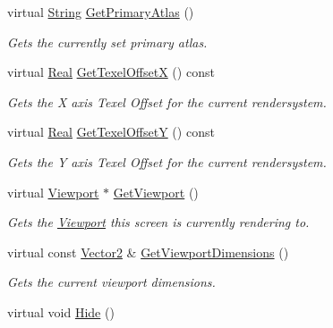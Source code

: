 \begin{DoxyCompactItemize}
virtual \hyperlink{namespaceMezzanine_acf9fcc130e6ebf08e3d8491aebcf1c86}{String} \hyperlink{classMezzanine_1_1UI_1_1Screen_adafbc28919ebb4d2d65e54daa0676177}{GetPrimaryAtlas} ()
\begin{DoxyCompactList}\small\item\em Gets the currently set primary atlas. \item\end{DoxyCompactList}\item 
virtual \hyperlink{namespaceMezzanine_a726731b1a7df72bf3583e4a97282c6f6}{Real} \hyperlink{classMezzanine_1_1UI_1_1Screen_af713ab0b229c33e0878e1f0d681e731f}{GetTexelOffsetX} () const 
\begin{DoxyCompactList}\small\item\em Gets the X axis Texel Offset for the current rendersystem. \item\end{DoxyCompactList}\item 
virtual \hyperlink{namespaceMezzanine_a726731b1a7df72bf3583e4a97282c6f6}{Real} \hyperlink{classMezzanine_1_1UI_1_1Screen_a1b8584eaecf431a164a8d31c55bf38b5}{GetTexelOffsetY} () const 
\begin{DoxyCompactList}\small\item\em Gets the Y axis Texel Offset for the current rendersystem. \item\end{DoxyCompactList}\item 
virtual \hyperlink{classMezzanine_1_1Viewport}{Viewport} $\ast$ \hyperlink{classMezzanine_1_1UI_1_1Screen_afda0f83107b413f14fb56e6cd007b243}{GetViewport} ()
\begin{DoxyCompactList}\small\item\em Gets the \hyperlink{classMezzanine_1_1Viewport}{Viewport} this screen is currently rendering to. \item\end{DoxyCompactList}\item 
virtual const \hyperlink{classMezzanine_1_1Vector2}{Vector2} \& \hyperlink{classMezzanine_1_1UI_1_1Screen_a12199967ad8a0e91cf816083aaa2a5d0}{GetViewportDimensions} ()
\begin{DoxyCompactList}\small\item\em Gets the current viewport dimensions. \item\end{DoxyCompactList}\item 
\hypertarget{classMezzanine_1_1UI_1_1Screen_aad220f00a62a75ab73e4620e853acdca}{
virtual void \hyperlink{classMezzanine_1_1UI_1_1Screen_aad220f00a62a75ab73e4620e853acdca}{Hide} ()}
\label{classMezzanine_1_1UI_1_1Screen_aad220f00a62a75ab73e4620e853acdca}


\end{DoxyCompactItemize}
